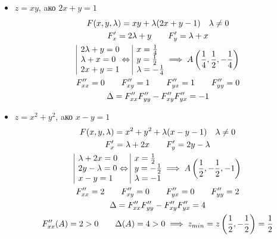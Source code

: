 \documentclass[a4paper,fleqn,12pt]{article}
\theoremstyle{definition}
\begin{document}
\begin{itemize}
\item $z = xy$, aко $2x+y=1$
\begin{gather*}
F(x,y,\lambda)   = xy + \lambda(2x+y-1) \quad \lambda \neq 0\\
F'_x = 2\lambda +y \qquad F'_y = \lambda + x \\
\begin{array}{|l@{}}
2\lambda +y= 0 \\
\lambda + x = 0\\
2x+y=1 
\end{array}\Leftrightarrow 
\begin{array}{|l@{}}
x = \frac{1}{4} \\
y = \frac{1}{2} \\
\lambda = -\frac{1}{4}
\end{array} \implies 
A \left( \frac{1}{4}, \frac{1}{2}, -\frac{1}{4}\right) \\
F''_{xx} = 0 \qquad F''_{xy} = 1 \qquad F''_{yx} = 1 \qquad F''_{yy} = 0\\
\Delta =  F''_{xx}F''_{yy} - F''_{xy}F''_{yx} = -1
\end{gather*}

\item $z = x^2 + y^2$, aко $x - y =1$
\begin{gather*}
F(x,y,\lambda)  = x^2 + y^2 + \lambda(x-y-1)  \quad \lambda \neq 0 \\
F'_x = \lambda + 2x \qquad F'_y = 2y - \lambda \\
\begin{array}{|l@{}}
\lambda + 2x = 0\\
2y - \lambda = 0\\
x-y = 1
\end{array}\Leftrightarrow 
\begin{array}{|l@{}}
x = \frac{1}{2} \\
y = -\frac{1}{2} \\
\lambda = -1
\end{array}
\implies 
A \left( \frac{1}{2}, -\frac{1}{2}, -1\right) \\
F''_{xx} = 2 \qquad F''_{xy} = 0 \qquad F''_{yx} = 0 \qquad F''_{yy} = 2\\
\Delta =  F''_{xx}F''_{yy} - F''_{xy}F''_{yx} = 4 \\
F''_{xx}(A) = 2>0 \qquad \Delta(A) = 4 >0 \implies z_{min} = z \left( \frac{1}{2}, -\frac{1}{2}\right) = \frac{1}{2}
\end{gather*}


\end{itemize}
\end{document}
